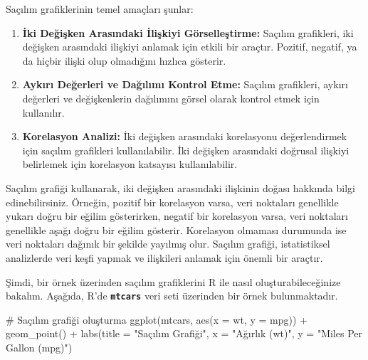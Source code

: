 \documentclass[
  letterpaper,
  DIV=11,
  numbers=noendperiod]{scrreprt}
\newenvironment{Shaded}{\begin{snugshade}}{\end{snugshade}}
\newcommand{\AttributeTok}[1]{\textcolor[rgb]{0.40,0.45,0.13}{#1}}
\newcommand{\CommentTok}[1]{\textcolor[rgb]{0.37,0.37,0.37}{#1}}
\newcommand{\FunctionTok}[1]{\textcolor[rgb]{0.28,0.35,0.67}{#1}}
\newcommand{\NormalTok}[1]{\textcolor[rgb]{0.00,0.23,0.31}{#1}}
\newcommand{\SpecialCharTok}[1]{\textcolor[rgb]{0.37,0.37,0.37}{#1}}
\newcommand{\StringTok}[1]{\textcolor[rgb]{0.13,0.47,0.30}{#1}}
\begin{document}
Saçılım grafiklerinin temel amaçları şunlar:

\begin{enumerate}
\def\labelenumi{\arabic{enumi}.}
\item
  \textbf{İki Değişken Arasındaki İlişkiyi Görselleştirme:} Saçılım
  grafikleri, iki değişken arasındaki ilişkiyi anlamak için etkili bir
  araçtır. Pozitif, negatif, ya da hiçbir ilişki olup olmadığını hızlıca
  gösterir.
\item
  \textbf{Aykırı Değerleri ve Dağılımı Kontrol Etme:} Saçılım
  grafikleri, aykırı değerleri ve değişkenlerin dağılımını görsel olarak
  kontrol etmek için kullanılır.
\item
  \textbf{Korelasyon Analizi:} İki değişken arasındaki korelasyonu
  değerlendirmek için saçılım grafikleri kullanılabilir. İki değişken
  arasındaki doğrusal ilişkiyi belirlemek için korelasyon katsayısı
  kullanılabilir.
\end{enumerate}

Saçılım grafiği kullanarak, iki değişken arasındaki ilişkinin doğası
hakkında bilgi edinebilirsiniz. Örneğin, pozitif bir korelasyon varsa,
veri noktaları genellikle yukarı doğru bir eğilim gösterirken, negatif
bir korelasyon varsa, veri noktaları genellikle aşağı doğru bir eğilim
gösterir. Korelasyon olmaması durumunda ise veri noktaları dağınık bir
şekilde yayılmış olur. Saçılım grafiği, istatistiksel analizlerde veri
keşfi yapmak ve ilişkileri anlamak için önemli bir araçtır.

Şimdi, bir örnek üzerinden saçılım grafiklerini R ile nasıl
oluşturabileceğinize bakalım. Aşağıda, R'de \textbf{\texttt{mtcars}}
veri seti üzerinden bir örnek bulunmaktadır.

\begin{Shaded}
\begin{Highlighting}[]
\CommentTok{\# Saçılım grafiği oluşturma}
\FunctionTok{ggplot}\NormalTok{(mtcars, }\FunctionTok{aes}\NormalTok{(}\AttributeTok{x =}\NormalTok{ wt, }\AttributeTok{y =}\NormalTok{ mpg)) }\SpecialCharTok{+}
  \FunctionTok{geom\_point}\NormalTok{() }\SpecialCharTok{+}
  \FunctionTok{labs}\NormalTok{(}\AttributeTok{title =} \StringTok{"Saçılım Grafiği"}\NormalTok{,}
       \AttributeTok{x =} \StringTok{"Ağırlık (wt)"}\NormalTok{,}
       \AttributeTok{y =} \StringTok{"Miles Per Gallon (mpg)"}\NormalTok{)}
\end{Highlighting}
\end{Shaded}
\end{document}
